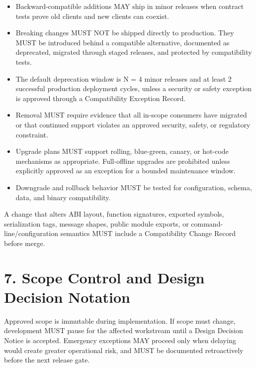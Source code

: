 \documentclass[11pt]{article}
\begin{document}
\begin{itemize}
  \item Backward-compatible additions MAY ship in minor releases when contract tests prove old clients and new clients can coexist.
  \item Breaking changes MUST NOT be shipped directly to production. They MUST be introduced behind a compatible alternative, documented as deprecated, migrated through staged releases, and protected by compatibility tests.
  \item The default deprecation window is N = 4 minor releases and at least 2 successful production deployment cycles, unless a security or safety exception is approved through a Compatibility Exception Record.
  \item Removal MUST require evidence that all in-scope consumers have migrated or that continued support violates an approved security, safety, or regulatory constraint.
  \item Upgrade plans MUST support rolling, blue-green, canary, or hot-code mechanisms as appropriate. Full-offline upgrades are prohibited unless explicitly approved as an exception for a bounded maintenance window.
  \item Downgrade and rollback behavior MUST be tested for configuration, schema, data, and binary compatibility.
\end{itemize}
A change that alters ABI layout, function signatures, exported symbols, serialization tags, message shapes, public module exports, or command-line/configuration semantics MUST include a Compatibility Change Record before merge.


\hypertarget{sec-scope-change-control}{}
\section*{7. Scope Control and Design Decision Notation}
Approved scope is immutable during implementation. If scope must change, development MUST pause for the affected workstream until a Design Decision Notice is accepted. Emergency exceptions MAY proceed only when delaying would create greater operational risk, and MUST be documented retroactively before the next release gate.
\end{document}
